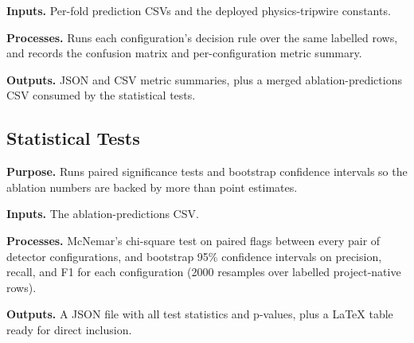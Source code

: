 \noindent\textbf{Inputs.} Per-fold prediction CSVs and the deployed physics-tripwire constants.

\noindent\textbf{Processes.} Runs each configuration's decision rule over the same labelled rows, and records the confusion matrix and per-configuration metric summary.

\noindent\textbf{Outputs.} JSON and CSV metric summaries, plus a merged ablation-predictions CSV consumed by the statistical tests.



\subsection{Statistical Tests}
\label{sec:code_stats_tests}

\noindent\textbf{Purpose.} Runs paired significance tests and bootstrap confidence intervals so the ablation numbers are backed by more than point estimates.

\noindent\textbf{Inputs.} The ablation-predictions CSV.

\noindent\textbf{Processes.} McNemar's chi-square test on paired flags between every pair of detector configurations, and bootstrap 95\% confidence intervals on precision, recall, and F1 for each configuration (2000 resamples over labelled project-native rows).

\noindent\textbf{Outputs.} A JSON file with all test statistics and p-values, plus a LaTeX table ready for direct inclusion.


